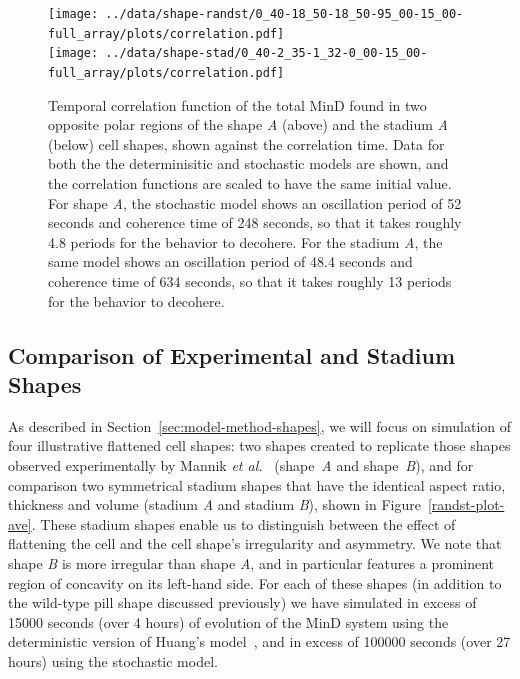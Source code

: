 \documentclass[10pt,letterpaper]{article}
\begin{document}
\begin{figure}
  \begin{center}
    \texttt{[image: ../data/shape-randst/0\_40-18\_50-18\_50-95\_00-15\_00-full\_array/plots/correlation.pdf]}\\
    \texttt{[image: ../data/shape-stad/0\_40-2\_35-1\_32-0\_00-15\_00-full\_array/plots/correlation.pdf]}
  \end{center}
  \caption{Temporal correlation function of the total MinD found in
    two opposite polar regions of the shape \emph{A} (above) and the
    stadium \emph{A} (below) cell shapes, shown against the
    correlation time.  Data for both the the determinisitic and
    stochastic models are shown, and the correlation functions are
    scaled to have the same initial value.  For shape \emph{A}, the
    stochastic model shows an oscillation period of 52 seconds and
    coherence time of 248 seconds, so that it takes roughly 4.8
    periods for the behavior to decohere.  For the stadium \emph{A},
    the same model shows an oscillation period of 48.4 seconds and
    coherence time of 634 seconds, so that it takes roughly 13
    periods for the behavior to decohere.}
  \label{fig:corr-pancake-A}
\end{figure}

\subsection*{Comparison of Experimental and Stadium Shapes}

As described in Section~\ref{sec:model-method-shapes}, we will focus
on simulation of four illustrative flattened cell shapes: two shapes
created to replicate those shapes observed experimentally by
Mannik \emph{et al.}~\cite{mannik2012robustness} (shape~\emph{A} and
shape~\emph{B}), and for comparison two symmetrical stadium shapes
that have the identical aspect ratio, thickness and volume (stadium
\emph{A} and stadium \emph{B}), shown in Figure~\ref{randst-plot-ave}.
These stadium shapes enable us to distinguish between the effect of
flattening the cell and the cell shape's irregularity and asymmetry.
We note that shape \emph{B} is more irregular than shape \emph{A}, and
in particular features a prominent region of concavity on its
left-hand side.  For each of these shapes (in addition to the
wild-type pill shape discussed previously) we have simulated in excess
of 15000 seconds (over 4 hours) of evolution of the MinD system using
the deterministic version of Huang's model~\cite{huang2003dynamic},
and in excess of 100000 seconds (over 27 hours) using the stochastic
model.
\end{document}
